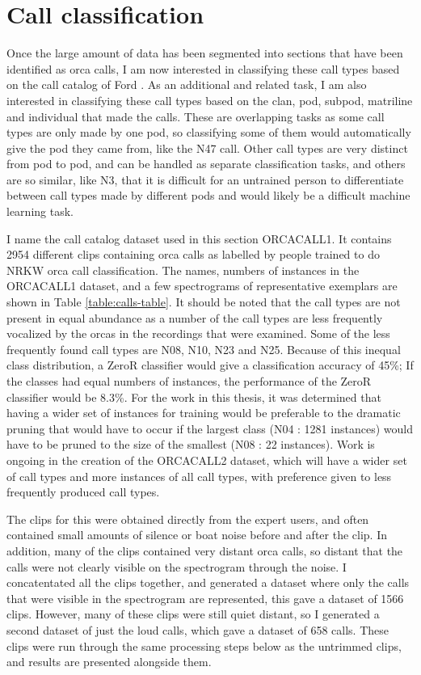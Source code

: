 \section{Call classification}

Once the large amount of data has been segmented into sections that
have been identified as orca calls, I am now interested in
classifying these call types based on the call catalog of Ford
\cite{ford1987catalogue}.  As an additional and related task, I am
also interested in classifying these call types based on the clan, pod,
subpod, matriline and individual that made the calls.  These are
overlapping tasks as some call types are only made by one pod, so
classifying some of them would automatically give the pod they came
from, like the N47 call.  Other call types are very distinct from pod to
pod, and can be handled as separate classification tasks, and others
are so similar, like N3, that it is difficult for an untrained person
to differentiate between call types made by different pods and would likely
be a difficult machine learning task.

I name the call catalog dataset used in this section ORCACALL1.  It
contains 2954 different clips containing orca calls as labelled by
people trained to do NRKW orca call classification.  The names,
numbers of instances in the ORCACALL1 dataset, and a few spectrograms
of representative exemplars are shown in Table
\ref{table:calls-table}.  It should be noted that the call types are
not present in equal abundance as a number of the call types are less
frequently vocalized by the orcas in the recordings that were
examined.  Some of the less frequently found call types are N08, N10,
N23 and N25.  Because of this inequal class distribution, a ZeroR
classifier would give a classification accuracy of 45\%; If the
classes had equal numbers of instances, the performance of the ZeroR
classifier would be 8.3\%.  For the work in this thesis, it was
determined that having a wider set of instances for training would be
preferable to the dramatic pruning that would have to occur if the
largest class (N04 : 1281 instances) would have to be pruned to the
size of the smallest (N08 : 22 instances).  Work is ongoing in the
creation of the ORCACALL2 dataset, which will have a wider set of call
types and more instances of all call types, with preference given to
less frequently produced call types.

The clips for this were obtained directly from the expert users, and
often contained small amounts of silence or boat noise before and
after the clip.  In addition, many of the clips contained very distant
orca calls, so distant that the calls were not clearly visible on the
spectrogram through the noise.  I concatentated all the clips
together, and generated a dataset where only the calls that were
visible in the spectrogram are represented, this gave a dataset of
1566 clips.  However, many of these clips were still quiet distant, so
I generated a second dataset of just the loud calls, which gave a
dataset of 658 calls.  These clips were run through the same
processing steps below as the untrimmed clips, and results are
presented alongside them.

